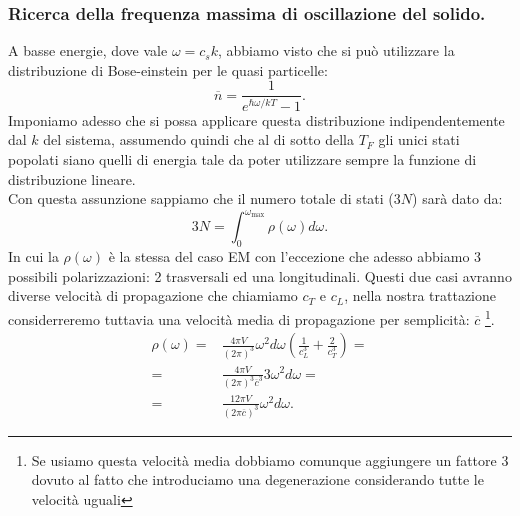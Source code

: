 \subsubsection{Ricerca della frequenza massima di oscillazione del solido.}
\label{subsubsec:Ricerca della frequenza massima di oscillazione del solido.}
A basse energie, dove vale $\omega = c_s k$, abbiamo visto che si può utilizzare la distribuzione di Bose-einstein per le quasi particelle:
\[
	\overline{n}
	=
	\frac{1}{e^{\hbar\omega /kT}-1}
.\] 
Imponiamo adesso che si possa applicare questa distribuzione indipendentemente dal $k$ del sistema, assumendo quindi che al di sotto della $T_F$ gli unici stati popolati siano quelli di energia tale da poter utilizzare sempre la funzione di distribuzione lineare.\\
Con questa assunzione sappiamo che il numero totale di stati ($3N$) sarà dato da:
\[
	3N 
	=
	\int_{0}^{\omega _\text{max} }
	\rho ( \omega ) d\omega  
	\label{eq:n-stati-onde-solidi}
.\] 
In cui la $\rho ( \omega ) $ è la stessa del caso EM con l'eccezione che adesso abbiamo 3 possibili polarizzazioni: 2 trasversali ed una longitudinali. 
Questi due casi avranno diverse velocità di propagazione che chiamiamo $c_T$ e $c_L$, nella nostra trattazione considerreremo tuttavia una velocità media di propagazione per semplicità: $\overline{c}$ \footnote{Se usiamo questa velocità media dobbiamo comunque aggiungere un fattore 3 dovuto al fatto che introduciamo una degenerazione considerando tutte le velocità uguali}.
\[\begin{aligned}
	 \rho ( \omega ) 
	 =&
	 \frac{4\pi V}{\left( 2\pi \right) ^3}
	 \omega^2d\omega 
	 \left( 
	 \frac{1}{c_L^3} + \frac{2}{c_T^3}	
	 \right) =\\
	 =& 
	 \frac{4\pi V}{\left( 2\pi \right) ^3\overline{c}^3}
	 3\omega^2d\omega = \\
	 =& \frac{12\pi V}{\left( 2\pi \overline{c}\right)^3}
	 \omega^2d\omega 
.\end{aligned}\]
